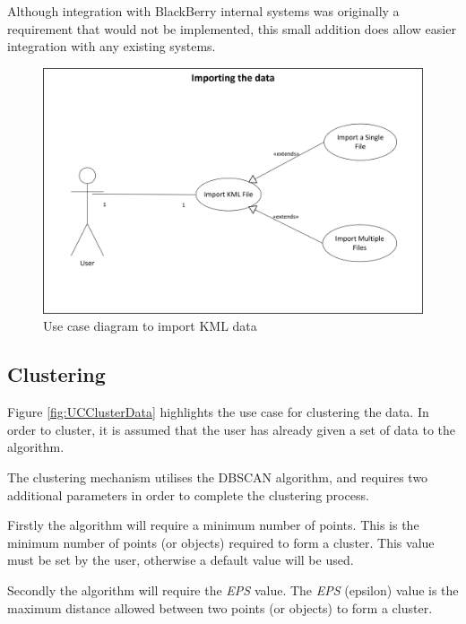Although integration with BlackBerry internal systems was originally a 
requirement that would not be implemented, this small addition does allow 
easier integration with any existing systems.

\begin{figure}[H]
  \centering
    \includegraphics[scale=0.8]{chapter7/use_case/importing_data.png}
    \caption[Use case diagram to import KML data]
            {Use case diagram to import KML data}
    \label{fig:UCImportData}
\end{figure}


\subsection{Clustering}
Figure \ref{fig:UCClusterData} highlights the use case for clustering the data. 
In order to cluster, it is assumed that the user has already given a set of 
data to the algorithm.

The clustering mechanism utilises the DBSCAN algorithm, and requires two 
additional parameters in order to complete the clustering process. 

Firstly the algorithm will require a minimum number of points. This is the 
minimum number of points (or objects) required to form a cluster. This value 
must be set by the user, otherwise a default value will be used.

Secondly the algorithm will require the {\em EPS} value. The {\em EPS} 
(epsilon) value is the maximum distance allowed between two points (or objects)
to form a cluster.

